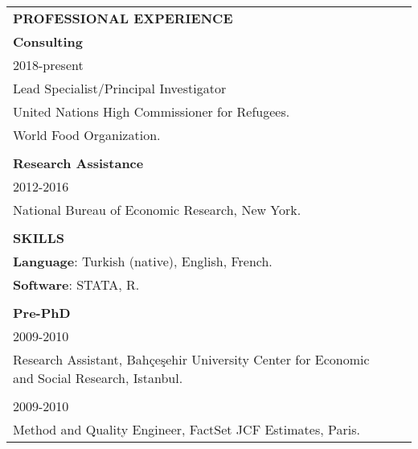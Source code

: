\documentclass[12 pt]{article}
\begin{document}
\begin{longtable}{ccccc}
\multicolumn{5}{l}{\textbf{PROFESSIONAL EXPERIENCE}}\\[2 pt] 
\multicolumn{4}{l}{\textbf{Consulting}} \\ 
\multicolumn{4}{l}{2018-present} \\ 
\multicolumn{4}{l}{Lead Specialist/Principal Investigator}    \\
\multicolumn{4}{l}{United Nations High Commissioner for Refugees.}   \\
\multicolumn{4}{l}{World Food Organization.}   \\

\\
\multicolumn{4}{l}{\textbf{Research Assistance}} \\ 
\multicolumn{4}{l}{2012-2016} \\ 
\multicolumn{4}{l}{National Bureau of Economic Research, New York.}  \\
\\



\multicolumn{5}{l}{\textbf{SKILLS}}\\[2 pt]

 \multicolumn{4}{l}{\textbf{Language}: Turkish (native), English, French.}      \\
  \multicolumn{4}{l}{\textbf{Software}: STATA, R.}\\
 \\


\multicolumn{4}{l}{\textbf{Pre-PhD}} \\[2 pt] 
\multicolumn{4}{l}{2009-2010} \\ 
\multicolumn{4}{l}{Research Assistant, Bah\c{c}e\c{s}ehir University Center for Economic and Social Research, Istanbul.}    \\

\\
\multicolumn{4}{l}{2009-2010} \\ 
\multicolumn{4}{l}{Method and Quality Engineer, FactSet JCF Estimates, Paris.}  \\




\end{longtable}

 
\end{document}
